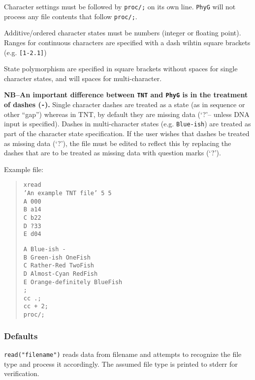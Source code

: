 \begin{description}
		Character settings must be followed by \texttt{proc/;} on its own line. \texttt{PhyG} will not process
		any file contents that follow \texttt{proc/;}.
		  
		 Additive/ordered character states must be numbers (integer or floating point). Ranges for continuous
		 characters are specified with a dash wihtin square brackets (e.g. \texttt{[1-2.1]})
		  
		 State polymorphism are specified in square brackets without spaces for
		 single character states, and will spaces for multi-character.
		  
		 \textbf{NB--An important difference between \texttt{TNT} and \texttt{PhyG} is in the treatment of dashes (\texttt{-}).} 
		 Single character dashes are treated as a state (as in sequence or other ``gap'') whereas in TNT, by default they 
		 are missing data (`?'-- unless DNA input is specified). Dashes in multi-character states (e.g. \texttt{Blue-ish}) are 
		 treated as part of the character state specification. If the user wishes that dashes be treated as missing data (`?'), 
		 the file must be edited to reflect this by replacing the dashes that are to be treated as missing data with question 
		 marks (`?').
		  
		  Example file:
		  	\begin{quote}
			  	\texttt{xread\\
				  	'An example TNT file' 5 5\\
				  	A 000\\
				  	B a14\\
				  	C b22\\
				  	D ?33\\
				  	E d04\\}
			  	
			  	\texttt{A Blue-ish -\\
				  	B Green-ish OneFish\\
				  	C Rather-Red TwoFish\\
				  	D Almost-Cyan RedFish\\
				  	E Orange-definitely BlueFish\\
				  	;\\
				  	cc .;\\
				  	cc + 2;\\
				  	proc/;\\}
			  \end{quote}
	\end{description}	
		
	\subsubsection{Defaults}
		\texttt{read("filename")} reads data from filename and attempts to recognize the file type and 
		process it accordingly. The assumed file type is printed to stderr for verification.
		
